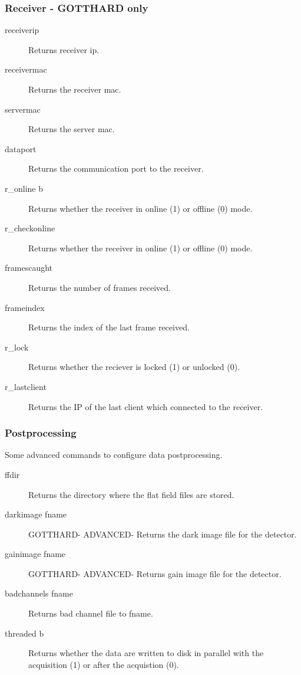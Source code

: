 \documentclass{article}
\begin{document}
\subsubsection{Receiver -  GOTTHARD only}
\begin{description}
\item[receiverip] Returns receiver ip. 
\item[receivermac]Returns the receiver mac. 
\item[servermac] Returns the server mac. 
\item[dataport]  Returns the communication port to the receiver.  
\item[r\_online b] Returns whether the receiver in online (1) or offline (0) mode.           
\item[r\_checkonline]       Returns whether the receiver in online (1) or offline (0) mode.   
\item[framescaught]       Returns the number of frames received.      
\item[frameindex]     Returns the index of the last frame received.      
\item[r\_lock] Returns whether the reciever is locked (1) or unlocked (0).   
\item[r\_lastclient]    Returns the IP of the last client which connected to the receiver. 
\end{description} 

\subsubsection{Postprocessing}
Some advanced commands to configure data postprocessing.
\begin{description}      
\item[ffdir] Returns the directory where the flat field files are stored.
\item[darkimage fname] GOTTHARD- ADVANCED- Returns the dark image file for the detector.       
\item[gainimage fname] GOTTHARD- ADVANCED- Returns gain image file for the detector. 
\item[badchannels fname] Returns bad channel file to fname.    
\item[threaded b] Returns whether the data are written to disk in parallel with the acquisition (1) or after the acquistion (0).      
\end{description}
\end{document}
